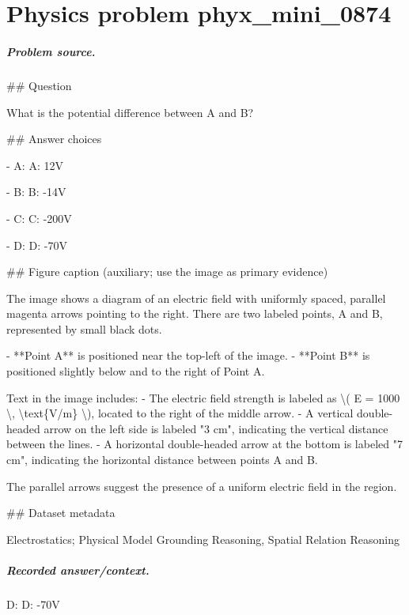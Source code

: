 
\chapter{Physics problem phyx\_mini\_0874}
\label{ch:PhyXMiniProblems_problem_phyx_mini_0874}

\paragraph{Problem source.}
\#\# Question

What is the potential difference between A and B?

\#\# Answer choices

- A: A: 12V

- B: B: -14V

- C: C: -200V

- D: D: -70V

\#\# Figure caption (auxiliary; use the image as primary evidence)

The image shows a diagram of an electric field with uniformly spaced, parallel magenta arrows pointing to the right. There are two labeled points, A and B, represented by small black dots.

- **Point A** is positioned near the top-left of the image.
- **Point B** is positioned slightly below and to the right of Point A.

Text in the image includes:
- The electric field strength is labeled as \textbackslash{}( E = 1000 \textbackslash{}, \textbackslash{}text\{V/m\} \textbackslash{}), located to the right of the middle arrow.
- A vertical double-headed arrow on the left side is labeled "3 cm", indicating the vertical distance between the lines.
- A horizontal double-headed arrow at the bottom is labeled "7 cm", indicating the horizontal distance between points A and B.

The parallel arrows suggest the presence of a uniform electric field in the region.

\#\# Dataset metadata

Electrostatics; Physical Model Grounding Reasoning, Spatial Relation Reasoning

\paragraph{Recorded answer/context.}
D: D: -70V

